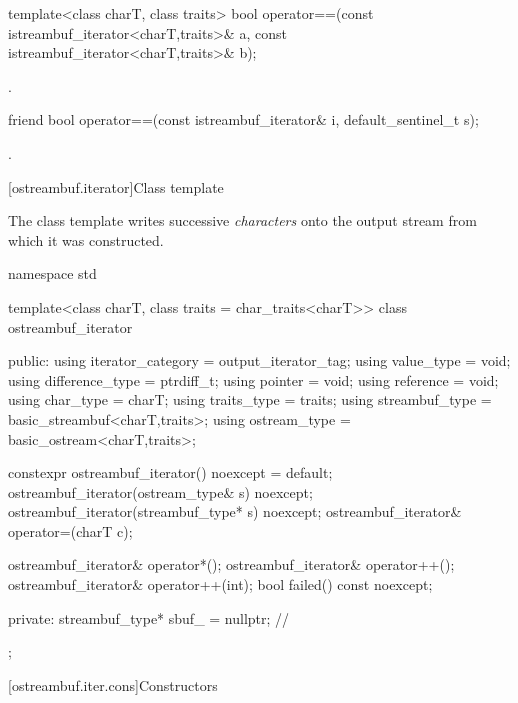 %
\begin{itemdecl}
template<class charT, class traits>
  bool operator==(const istreambuf_iterator<charT,traits>& a,
                  const istreambuf_iterator<charT,traits>& b);
\end{itemdecl}

\begin{itemdescr}
\pnum
\returns
{}.
\end{itemdescr}

%
\begin{itemdecl}
friend bool operator==(const istreambuf_iterator& i, default_sentinel_t s);
\end{itemdecl}

\begin{itemdescr}
\pnum
\returns
{}.
\end{itemdescr}

[ostreambuf.iterator]{Class template }

\pnum
The class template 
writes successive \textit{characters} onto the output stream
from which it was constructed.

%
\begin{codeblock}
namespace std {
  template<class charT, class traits = char_traits<charT>>
  class ostreambuf_iterator {
  public:
    using iterator_category = output_iterator_tag;
    using value_type        = void;
    using difference_type   = ptrdiff_t;
    using pointer           = void;
    using reference         = void;
    using char_type         = charT;
    using traits_type       = traits;
    using streambuf_type    = basic_streambuf<charT,traits>;
    using ostream_type      = basic_ostream<charT,traits>;

    constexpr ostreambuf_iterator() noexcept = default;
    ostreambuf_iterator(ostream_type& s) noexcept;
    ostreambuf_iterator(streambuf_type* s) noexcept;
    ostreambuf_iterator& operator=(charT c);

    ostreambuf_iterator& operator*();
    ostreambuf_iterator& operator++();
    ostreambuf_iterator& operator++(int);
    bool failed() const noexcept;

  private:
    streambuf_type* sbuf_ = nullptr;    // \expos
  };
}
\end{codeblock}

[ostreambuf.iter.cons]{Constructors}

